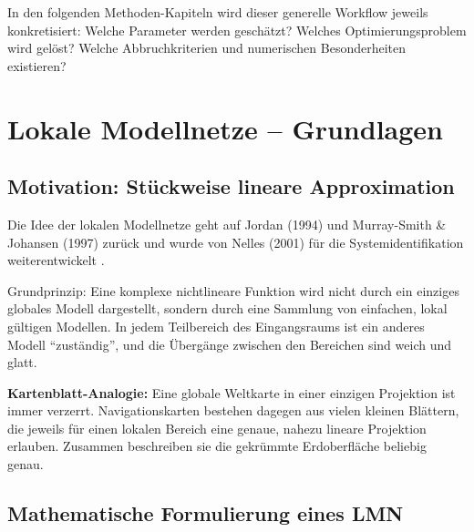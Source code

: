 \documentclass[11pt,a4paper]{report}
\begin{document}
\begin{hinweisbox}
In den folgenden Methoden-Kapiteln wird dieser generelle Workflow jeweils konkretisiert:
Welche Parameter werden gesch\"{a}tzt? Welches Optimierungsproblem wird gel\"{o}st?
Welche Abbruchkriterien und numerischen Besonderheiten existieren?
\end{hinweisbox}

\chapter{Lokale Modellnetze -- Grundlagen}

\section{Motivation: St\"{u}ckweise lineare Approximation}

Die Idee der lokalen Modellnetze geht auf Jordan (1994) und Murray-Smith \& Johansen (1997)
zur\"{u}ck und wurde von Nelles (2001) f\"{u}r die Systemidentifikation weiterentwickelt
\cite{nelles2001, murray1998}.

Grundprinzip: Eine komplexe nichtlineare Funktion wird nicht durch ein einziges globales
Modell dargestellt, sondern durch eine Sammlung von einfachen, lokal g\"{u}ltigen Modellen.
In jedem Teilbereich des Eingangsraums ist ein anderes Modell "`zust\"{a}ndig"', und die
\"{U}berg\"{a}nge zwischen den Bereichen sind weich und glatt.

\begin{analogiebox}
\textbf{Kartenblatt-Analogie:} Eine globale Weltkarte in einer einzigen Projektion ist immer
verzerrt. Navigationskarten bestehen dagegen aus vielen kleinen Bl\"{a}ttern, die jeweils f\"{u}r
einen lokalen Bereich eine genaue, nahezu lineare Projektion erlauben. Zusammen beschreiben
sie die gekr\"{u}mmte Erdoberfl\"{a}che beliebig genau.
\end{analogiebox}

\section{Mathematische Formulierung eines LMN}
\label{sec:lmn_formulation}
\end{document}
